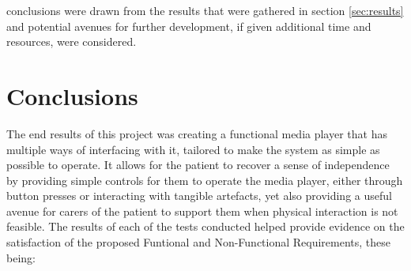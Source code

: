 %

 conclusions were drawn from the results that were gathered in section \ref{sec:results} and potential avenues for further development, if given additional time and resources, were considered.

\section{Conclusions}\label{sec:conclusions}
The end results of this project was creating a functional media player that has multiple ways of interfacing with it, tailored to make the system as simple as possible to operate. It allows for the patient to recover a sense of independence by providing simple controls for them to operate the media player, either through button presses or interacting with tangible artefacts, yet also providing a useful avenue for carers of the patient to support them when physical interaction is not feasible. The results of each of the tests conducted helped provide evidence on the satisfaction of the proposed Funtional and Non-Functional Requirements, these being:


